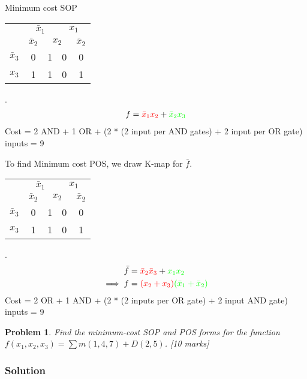 \documentclass[twocolumn]{article}
\newtheorem{prob}{Problem}
\newcommand{\bx}{\bar{x}}
\newcommand{\cred}{\color{red}}
\newcommand{\cg}{\color{green}}
\begin{document}
Minimum cost SOP
\\
\begin{tabular}{c|c|c|c|c}
  \toprule
  & \multicolumn{2}{c|}{$\bx_1$} & \multicolumn{2}{c}{$x_1$}
  \\
  & $\bx_2$ & \multicolumn{2}{c|}{$x_2$} & $\bx_2$
  \\ \midrule
  $\bx_3$
                                  & 0 & {\color{red}1} & 0 & 0
  \\
  $x_3$
                                  & {\color{green}1} & {\color{red}1} & 0 & {\color{green}1}
  \\\bottomrule
\end{tabular}.
\\
\begin{align}
  f = {\cred \bx_1 x_2} + {\cg \bx_2 x_3}
\end{align}
Cost = 2 AND  + 1 OR + (2 * (2 input per AND gates) + 2 input per OR gate) inputs = 9

To find Minimum cost POS, we draw K-map for $\bar{f}$.
\\
\begin{tabular}{c|c|c|c|c}
  \toprule
  & \multicolumn{2}{c|}{$\bx_1$} & \multicolumn{2}{c}{$x_1$}
  \\
  & $\bx_2$ & \multicolumn{2}{c|}{$x_2$} & $\bx_2$
  \\ \midrule
  $\bx_3$
  & \cred 0 & 1 & \cg 0 & \cred 0
  \\
  $x_3$
  & 1 & 1 & \cg 0 & 1
  \\\bottomrule
\end{tabular}.
\\
\begin{align}
  \bar{f} &= {\cred \bx_2 \bx_3} + {\cg x_1 x_2 }
  \\
  \implies f &= {\cred (x_2 + x_3)}{\cg (\bx_1 + \bx_2) }
\end{align}
Cost = 2 OR + 1 AND + (2 * (2 inputs per OR gate) + 2 input AND gate) inputs = 9

\begin{prob}
Find the minimum-cost SOP and POS forms for the function $f(x_1 , x_2 , x_3) =
\sum m(1, 4, 7) + D(2, 5)$. \cite[Prob 2.38]{brown2013fundamentals} [10 marks]
\end{prob}

\subsubsection*{Solution}
\end{document}
